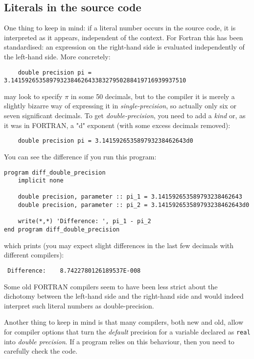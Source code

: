 \subsection{Literals in the source code}
One thing to keep in mind: if a literal number occurs in the source code, it is interpreted
as it appears, independent of the context. For Fortran this has been standardised: an expression
on the right-hand side is evaluated independently of the left-hand side. More concretely:
\begin{verbatim}
    double precision pi = 3.14159265358979323846264338327950288419716939937510
\end{verbatim}
\noindent may look to specify $\pi$ in some 50 decimals, but to the compiler it is
merely a slightly bizarre way of expressing it in \emph{single-precision}, so actually
only six or seven significant decimals. To get \emph{double-precision}, you need to
add a \emph{kind} or, as it was in FORTRAN, a "d" exponent (with some excess decimals removed):
\begin{verbatim}
    double precision pi = 3.141592653589793238462643d0
\end{verbatim}

You can see the difference if you run this program:
\begin{verbatim}
program diff_double_precision
    implicit none

    double precision, parameter :: pi_1 = 3.141592653589793238462643
    double precision, parameter :: pi_2 = 3.141592653589793238462643d0

    write(*,*) 'Difference: ', pi_1 - pi_2
end program diff_double_precision
\end{verbatim}
\noindent which prints (you may expect slight differences in the last few decimals with
different compilers):
\begin{verbatim}
 Difference:    8.7422780126189537E-008
\end{verbatim}

Some old FORTRAN compilers seem to have been less strict about the dichotomy between
the left-hand side and the right-hand side and would indeed interpret such literal
numbers as double-precision.

Another thing to keep in mind is that many compilers, both new and old, allow for
compiler options that turn the \emph{default} precision for a variable declared as \verb+real+
into \emph{double precision}. If a program relies on this behaviour, then you need to
carefully check the code.

